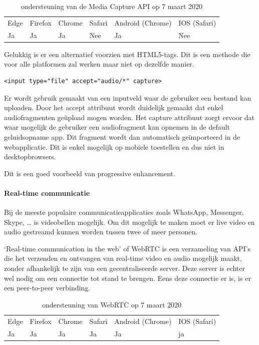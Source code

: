 \begin{table}[H]
	\centering
	\begin{tabular}{llllll}
		Edge & Firefox & Chrome & Safari & Android (Chrome) & IOS (Safari) \\
		Ja   & Ja      & Ja     & Nee     & Ja               & Nee          
	\end{tabular}	
	\caption{ondersteuning van de Media Capture API op 7 maart 2020}
\end{table}

Gelukkig is er een alternatief voorzien met HTML5-tags. Dit is een methode die voor alle platformen zal werken maar niet op dezelfde manier.

\begin{lstlisting}
<input type="file" accept="audio/*" capture>
\end{lstlisting}

Er wordt gebruik gemaakt van een inputveld waar de gebruiker een bestand kan uploaden. Door het accept attribuut wordt duidelijk gemaakt dat enkel audiofragmenten geüpload mogen worden. Het capture attribuut zorgt ervoor dat waar mogelijk de gebruiker een audiofragment kan opnemen in de default geluidsopname app. Dit fragment wordt dan automatisch geïmporteerd in de webapplicatie. Dit is enkel mogelijk op mobiele toestellen en dus niet in desktopbrowsers.
\autocite{Kinlan2019}

Dit is een goed voorbeeld van progressive enhancement. 



\paragraph{Real-time communicatie }


Bij de meeste populaire communicatieapplicaties zoals WhatsApp, Messenger, Skype, … is videobellen mogelijk. Om dit mogelijk te maken moet er live video en audio gestreamd kunnen worden tussen twee of meer personen.

‘Real-time communication in the web’ of WebRTC \autocite{Jennings2019} is een verzameling van API’s die het verzenden en ontvangen van real-time video en audio mogelijk maakt, zonder afhankelijk te zijn van een gecentraliseerde server. Deze server is echter wel nodig om een connectie tot stand te brengen. Eens deze connectie er is, is er een peer-to-peer verbinding.

\begin{table}[H]
	\centering
	\begin{tabular}{llllll}
		Edge & Firefox & Chrome & Safari & Android (Chrome) & IOS (Safari) \\
		Ja   & Ja      & Ja     & Ja     & Ja               & ja          
	\end{tabular}	
	\caption{ondersteuning van WebRTC op 7 maart 2020}
\end{table}




